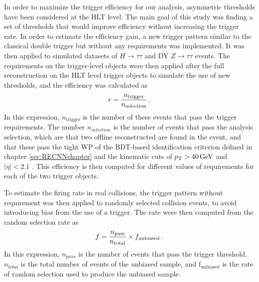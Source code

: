 In order to maximize the trigger efficiency for our analysis, asymmetric \pt thresholds have been considered at the HLT level. The main goal of this study was finding a set of \pt thresholds that would improve efficiency without increasing the trigger rate. 
In order to estimate the efficiency gain, a new trigger pattern similar to the classical double \tauh trigger but without any \pt requirements was implemented. It was then applied to simulated datasets of $H\rightarrow \tau\tau$ and DY $Z\rightarrow\tau\tau$ events. The \pt requirements on the trigger-level objects were then applied after the full reconstruction on the HLT level \tauh trigger objects to simulate the use of new \pt thresholds, and the efficiency was calculated as
\begin{equation}
    \epsilon = \frac{n_{\mathrm{trigger}}}{n_{\mathrm{selection}}} \mend
\end{equation}
In this expression, $n_{\mathrm{trigger}}$ is the number of these events that pass the trigger \pt requirements. The number $n_{selection}$ is the number of events that pass the analysis selection, which are that two offline reconstructed \tauh are found in the event, and that these \tauh pass the tight WP of the BDT-based identification criterion defined in chapter \ref{sec:RECNNchapter} and the kinematic cuts of $p_{\mathrm{T}} > 40\,\mathrm{GeV}$ and $|\eta| < 2.1$ . This efficiency is then computed for different values of \pt requirements for each of the two \tauh trigger objects.

To estimate the firing rate in real collisions, the trigger pattern without \pt requirement was then applied to randomly selected collision events, to avoid introducing bias from the use of a trigger.  The rate were then computed from the random selection rate as
\begin{equation}
    f = \frac{n_{\mathrm{pass}}}{n_{\mathrm{total}}} \times f_{\mathrm{unbiased}} \mend
\end{equation}
In this expression, $n_{pass}$ is the number of events that pass the trigger threshold, $n_{total}$ is the total number of events of the unbiased sample, and $\mathrm{f}_{\mathrm{unbiased}}$ is the rate of random selection used to produce the unbiased sample. 

